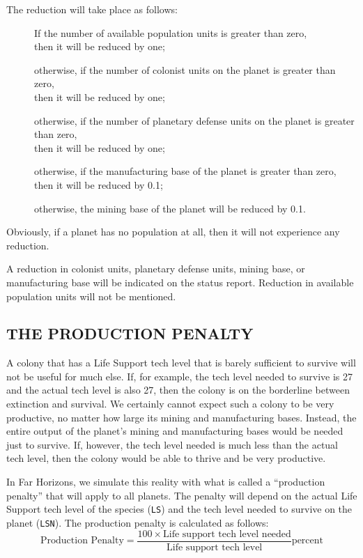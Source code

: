 \documentclass[10pt,titlepage]{article}
\begin{document}
The reduction will take place as follows:
\begin{description}

	 \item[]If the number of available population units is greater than zero, \\
		then it will be reduced by one;
 \item[]	otherwise, if the number of colonist units on the planet is greater than zero, \\
		then it will be reduced by one;
	 \item[]otherwise, if the number of planetary defense units on the planet is greater than zero, \\ 
		then it will be reduced by one;
	 \item[]otherwise, if the manufacturing base of the planet is greater than zero, \\ 
		then it will be reduced by 0.1;
	 \item[]otherwise, the mining base of the planet will be reduced by 0.1.
\end{description}
Obviously, if a planet has no population at all, then it will not experience
any reduction.

A reduction in colonist units, planetary defense units, mining base, or
manufacturing base will be indicated on the status report.  Reduction in
available population units will not be mentioned.

\subsection{THE PRODUCTION PENALTY}
\label{sec:productionpenalty}

A colony that has a Life Support tech level that is barely sufficient to
survive will not be useful for much else.  If, for example, the tech level
needed to survive is 27 and the actual tech level is also 27, then the colony
is on the borderline between extinction and survival.  We certainly cannot
expect such a colony to be very productive, no matter how large its mining and
manufacturing bases.  Instead, the entire output of the planet's mining and
manufacturing bases would be needed just to survive.  If, however, the tech
level needed is much less than the actual tech level, then the colony would
be able to thrive and be very productive.

In Far Horizons, we simulate this reality with what is called a ``production
penalty'' that will apply to all planets.  The penalty will depend on the actual
Life Support tech level of the species (\texttt{LS}) and the tech level needed to
survive on the planet (\texttt{LSN}).  The production penalty is calculated as follows:
\[
\textrm{Production Penalty}  =  \dfrac{100  \times  \textrm{Life support tech level needed}}{\textrm{Life support tech level}}\textrm{percent}
\]
\end{document}
